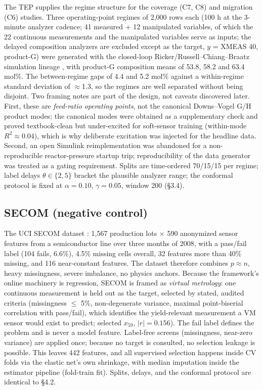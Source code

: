 The TEP \citep{downs1993} supplies the regime structure for the coverage (C7, C8)
and migration (C6) studies. Three operating-point regimes of 2,000 rows each (100 h at
the 3-minute analyzer cadence; 41 measured + 12 manipulated variables, of which the 22
continuous measurements and the manipulated variables serve as inputs; the delayed
composition analyzers are excluded except as the target, \(y\) = XMEAS 40, product-G) were generated with the closed-loop
Ricker/Russell--Chiang--Braatz simulation lineage \citep{bathelt2015}, with product-G
composition means of 53.8, 58.2 and 63.4 mol\%. The between-regime gaps of 4.4 and 5.2
mol\% against a within-regime standard deviation of $\approx$1.3, so the regimes are well
separated without being disjoint. Two framing notes are part of the design, not
caveats discovered later. First, these are \emph{feed-ratio operating points}, not the
canonical Downs--Vogel G/H product modes; the canonical modes were obtained as a
supplementary check and proved textbook-clean but under-excited for soft-sensor
training (within-mode \(R^2 \approx 0.04\)), which is why deliberate
excitation was injected for the headline data. Second, an open Simulink
reimplementation \citep{vosloo2025} was abandoned for a non-reproducible
reactor-pressure startup trip; reproducibility of the data generator was treated as a
gating requirement. Splits are time-ordered 70/15/15 per regime; label delays
\(\theta \in \{2, 5\}\) bracket the plausible analyzer range; the conformal protocol is
fixed at \(\alpha = 0.10\), \(\gamma = 0.05\), window 200 (\S 3.4).

\subsection{SECOM (negative control)}

The UCI SECOM dataset \citep{mccann2008secom}: 1,567 production lots $\times$ 590 anonymized
sensor features from a semiconductor line over three months of 2008, with a pass/fail
label (104 fails, 6.6\%), 4.5\% missing cells overall, 32 features more than 40\%
missing, and 116 near-constant features. The dataset therefore combines \(p \approx n\), heavy missingness, severe
imbalance, no physics anchors. Because the framework's online machinery is regression,
SECOM is framed as \emph{virtual metrology}: one continuous measurement is held out as the
target, selected by stated, audited criteria (missingness $\le$ 5\%, non-degenerate
variance, maximal \textbar point-biserial correlation\textbar{} with pass/fail), which identifies the yield-relevant
measurement a VM sensor would exist to predict; selected \(x_{59}\), \(|r| = 0.156\)). The
fail label defines the problem and is never a model feature. Label-free screens
(missingness, near-zero variance) are applied once; because no target is consulted, no
selection leakage is possible. This leaves 442 features, and all supervised selection happens
inside CV folds via the elastic net's own shrinkage, with median imputation inside the
estimator pipeline (fold-train fit). Splits, delays, and the conformal protocol are
identical to \S 4.2.

